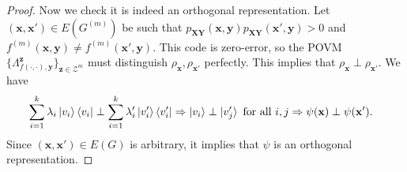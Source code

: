 \documentclass[10pt,a4paper]{amsart}
\newcommand{\bfX}{\mathbf{X}}
\newcommand{\bfY}{\mathbf{Y}}
\newcommand{\bfx}{\mathbf{x}}
\newcommand{\bfy}{\mathbf{y}}
\newcommand{\bfz}{\mathbf{z}}
\newcommand{\calZ}{\mathcal{Z}}
\begin{document}
\begin{proof}
Now we check it is indeed an orthogonal representation. Let    $(\bfx,\bfx')\in E(G^{(m)})$ be such that $p_{\bfX\bfY}(\bfx,\bfy)p_{\bfX\bfY}(\bfx',\bfy)>0$ and $f^{(m)}(\bfx,\bfy)\ne f^{(m)}(\bfx',\bfy)$.  This code  is zero-error, so the POVM $\{\Lambda^\bfz_{f(\cdot,\cdot), \bfy}\}_{\bfz \in \calZ^m}$ must distinguish $\rho_{\bfx},\rho_{\bfx'}$ perfectly. This implies that $\rho_{\bfx}\perp\rho_{\bfx'}$. We have 
\begin{align*}
   &  \sum_{i=1}^k \lambda_i\ket{v_i}\bra{v_i}  \perp  \sum_{i=1}^k \lambda_i'\ket{v_i'}\bra{v_i'}  \Rightarrow \ket{v_i}\perp\ket{v_j'}\text{ for all }i,j
   \Rightarrow \psi(\bfx) \perp \psi(\bfx').
\end{align*}
Since $(\bfx,\bfx')\in E(G)$ is arbitrary, it implies that $\psi$ is an orthogonal representation.  
\end{proof}
\end{document}
